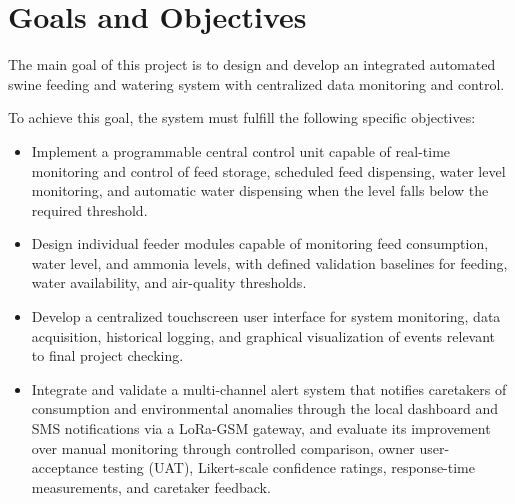 \section{Goals and Objectives}

The main goal of this project is to design and develop an integrated automated swine feeding and watering system with centralized data monitoring and control.

To achieve this goal, the system must fulfill the following specific objectives:

\begin{itemize}
  \item Implement a programmable central control unit capable of real-time monitoring and control of feed storage, scheduled feed dispensing, water level monitoring, and automatic water dispensing when the level falls below the required threshold.
  \item Design individual feeder modules capable of monitoring feed consumption, water level, and ammonia levels, with defined validation baselines for feeding, water availability, and air-quality thresholds.
  \item Develop a centralized touchscreen user interface for system monitoring, data acquisition, historical logging, and graphical visualization of events relevant to final project checking.
  \item Integrate and validate a multi-channel alert system that notifies caretakers of consumption and environmental anomalies through the local dashboard and SMS notifications via a LoRa-GSM gateway, and evaluate its improvement over manual monitoring through controlled comparison, owner user-acceptance testing (UAT), Likert-scale confidence ratings, response-time measurements, and caretaker feedback.
\end{itemize}
